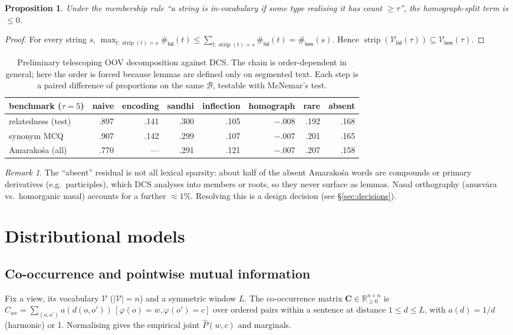 \documentclass[11pt,a4paper]{article}
\newtheorem{proposition}{Proposition}
\theoremstyle{remark}\newtheorem{remark}{Remark}
\newcommand{\View}{\varphi}             %
\newcommand{\Voc}{\mathcal{V}}          %
\newcommand{\B}{\mathcal{B}}            %
\newcommand{\cnt}{\#}                   %
\newcommand{\R}{\mathbb{R}}
\newcommand{\strip}{\operatorname{strip}}
\renewcommand{\v}[1]{\bm{#1}}           %
\newcommand{\vk}[1]{\textsf{#1}}         %
\begin{document}
\begin{proposition}
Under the membership rule ``a string is in-vocabulary if some type realising
it has count $\ge\tau$'', the homograph-split term is $\le 0$.
\end{proposition}
\begin{proof}
For every string $s$, $\max_{t:\strip(t)=s}\cnt_{\vk{lid}}(t)\le
\sum_{t:\strip(t)=s}\cnt_{\vk{lid}}(t)=\cnt_{\vk{lem}}(s)$. Hence
$\strip(\Voc_{\vk{lid}}(\tau))\subseteq\Voc_{\vk{lem}}(\tau)$.
\end{proof}

\begin{table}[h]\centering\small
\begin{tabular}{lrrrrrrr}
\toprule
benchmark ($\tau=5$) & naive & encoding & sandhi & inflection & homograph & rare & absent\\
\midrule
relatedness (test) & .897 & .141 & .300 & .105 & $-.008$ & .192 & .168\\
synonym MCQ        & .907 & .142 & .299 & .107 & $-.007$ & .201 & .165\\
Amarakośa (all)    & .770 & ---  & .291 & .121 & $-.007$ & .207 & .158\\
\bottomrule
\end{tabular}
\caption{Preliminary telescoping OOV decomposition against DCS. The chain is
order-dependent in general; here the order is forced because lemmas are
defined only on segmented text. Each step is a paired difference of
proportions on the same $\B$, testable with McNemar's test.}
\end{table}

\begin{remark}
The ``absent'' residual is not all lexical sparsity: about half of the absent
Amarakośa words are compounds or primary derivatives (e.g.\ participles), which
DCS analyses into members or roots, so they never surface as lemmas. Nasal
orthography (anusvāra vs.\ homorganic nasal) accounts for a further $\approx
1\%$. Resolving this is a design decision (see \S\ref{sec:decisions}).
\end{remark}

\section{Distributional models}
\subsection{Co-occurrence and pointwise mutual information}
Fix a view, its vocabulary $\Voc$ ($|\Voc|=n$) and a symmetric window $L$.
The co-occurrence matrix $\v{C}\in\R^{n\times n}_{\ge0}$ is
$C_{wc}=\sum_{(o,o')} a(d(o,o'))\,[\View(o)=w,\View(o')=c]$ over ordered pairs
within a sentence at distance $1\le d\le L$, with $a(d)=1/d$ (harmonic) or 1.
Normalising gives the empirical joint $\hat P(w,c)$ and marginals.
\end{document}
